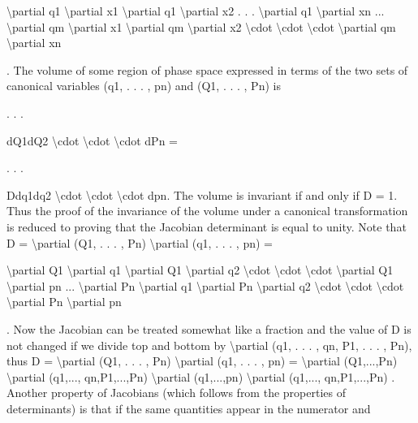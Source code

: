 \textbackslash{}partial q1
\textbackslash{}partial x1
\textbackslash{}partial q1
\textbackslash{}partial x2
. . .
\textbackslash{}partial q1
\textbackslash{}partial xn
...
\textbackslash{}partial qm
\textbackslash{}partial x1
\textbackslash{}partial qm
\textbackslash{}partial x2
\textbackslash{}cdot  \textbackslash{}cdot  \textbackslash{}cdot
\textbackslash{}partial qm
\textbackslash{}partial xn

.
The volume of some region of phase space expressed in terms of the two sets
of canonical variables (q1, . . . , pn) and (Q1, . . . , Pn) is

. . .

dQ1dQ2 \textbackslash{}cdot  \textbackslash{}cdot  \textbackslash{}cdot  dPn =

. . .

Ddq1dq2 \textbackslash{}cdot  \textbackslash{}cdot  \textbackslash{}cdot  dpn.
The volume is invariant if and only if D = 1. Thus the proof of the invariance
of the volume under a canonical transformation is reduced to proving that the
Jacobian determinant is equal to unity.
Note that
D = \textbackslash{}partial (Q1, . . . , Pn)
\textbackslash{}partial (q1, . . . , pn) =

\textbackslash{}partial Q1
\textbackslash{}partial q1
\textbackslash{}partial Q1
\textbackslash{}partial q2
\textbackslash{}cdot  \textbackslash{}cdot  \textbackslash{}cdot
\textbackslash{}partial Q1
\textbackslash{}partial pn
...
\textbackslash{}partial Pn
\textbackslash{}partial q1
\textbackslash{}partial Pn
\textbackslash{}partial q2
\textbackslash{}cdot  \textbackslash{}cdot  \textbackslash{}cdot
\textbackslash{}partial Pn
\textbackslash{}partial pn

.
Now the Jacobian can be treated somewhat like a fraction and the value of D
is not changed if we divide top and bottom by \textbackslash{}partial (q1, . . . , qn, P1, . . . , Pn), thus
D = \textbackslash{}partial (Q1, . . . , Pn)
\textbackslash{}partial (q1, . . . , pn) =
\textbackslash{}partial (Q1,...,Pn)
\textbackslash{}partial (q1,..., qn,P1,...,Pn)
\textbackslash{}partial (q1,...,pn)
\textbackslash{}partial (q1,..., qn,P1,...,Pn)
.
Another property of Jacobians (which follows from the properties of
determinants) is that if the same quantities appear in the numerator and

